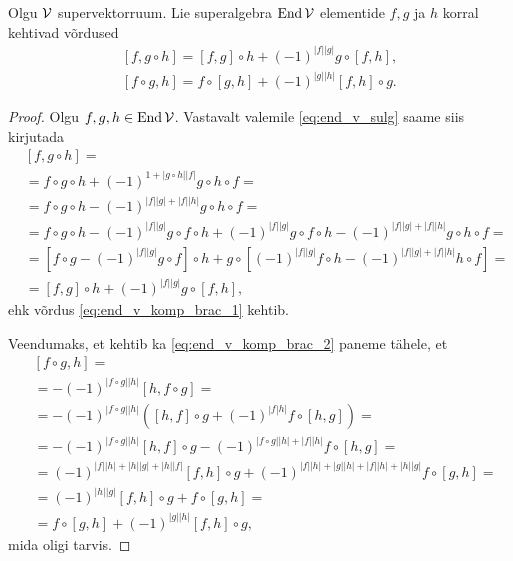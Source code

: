 \begin{lau}\label{lause:kompositsioon sulus}
    Olgu $\mathcal{V}$ supervektorruum. Lie superalgebra $\operatorname{End} \mathcal{V}$ elementide
    $f, g$ ja $h$ korral kehtivad võrdused
    \begin{align}
        \label{eq:end_v_komp_brac_1}
        [f, g \circ h] =
            [f, g] \circ h + (-1)^{|f||g|} g \circ [f, h], \\
        \label{eq:end_v_komp_brac_2}
        [f \circ g, h] =
            f \circ [g, h]+ (-1)^{|g||h|} [f, h] \circ g.
    \end{align}
\end{lau}

\begin{proof}
    Olgu $f, g, h \in \operatorname{End} \mathcal{V}$. Vastavalt valemile \eqref{eq:end_v_sulg}
    saame siis kirjutada
    \begin{align*}
        &[f, g \circ h] = \\
        &= f \circ g \circ h +
            (-1)^{1+|g \circ h| |f|} g \circ h \circ f = \\
        &= f \circ g \circ h -
            (-1)^{|f||g| + |f||h|} g \circ h \circ f = \\
        &= f \circ g \circ h - (-1)^{|f||g|} g \circ f \circ h +
            (-1)^{|f||g|} g \circ f \circ h -
            (-1)^{|f||g| + |f||h|} g \circ h \circ f = \\
        &= \left[ f \circ g - (-1)^{|f||g|} g \circ f \right] \circ h +
            g \circ \left[ (-1)^{|f||g|} f \circ h -
            (-1)^{|f||g| + |f||h|} h \circ f \right] = \\
        &= [f, g] \circ h + (-1)^{|f||g|} g \circ [f, h],
    \end{align*}
    ehk võrdus \eqref{eq:end_v_komp_brac_1} kehtib.

    Veendumaks, et kehtib ka \eqref{eq:end_v_komp_brac_2} paneme
    tähele, et
    \begin{align*}
        &[f \circ g, h] = \\
        &= -(-1)^{|f \circ g||h|} [h, f \circ g] = \\
        &= -(-1)^{|f \circ g||h|} \left(
            [h, f] \circ g + (-1)^{|f|h|} f \circ [h, g] \right) = \\
        &= -(-1)^{|f \circ g||h|} [h, f] \circ g -
            (-1)^{|f \circ g||h|+|f||h|} f \circ [h, g] = \\
        &= (-1)^{|f||h|+|h||g|+|h||f|} [f, h] \circ g +
            (-1)^{|f||h|+|g||h|+|f||h|+|h||g|} f \circ [g, h] = \\
        &= (-1)^{|h||g|} [f, h] \circ g + f \circ [g, h] = \\
        &= f \circ [g, h] + (-1)^{|g||h|} [f, h] \circ g,
    \end{align*}
    mida oligi tarvis.
\end{proof}

